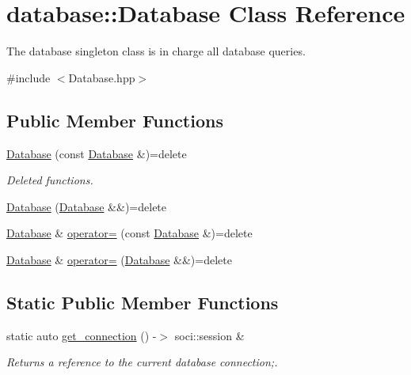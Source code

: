 \hypertarget{classdatabase_1_1_database}{}\section{database\+:\+:Database Class Reference}
\label{classdatabase_1_1_database}


The database singleton class is in charge all database queries.  




{\ttfamily \#include $<$Database.\+hpp$>$}

\subsection*{Public Member Functions}
\begin{DoxyCompactItemize}
\item 
\hyperlink{classdatabase_1_1_database_af32a0bd3a5a492d478a215ef50f6ed14}{Database} (const \hyperlink{classdatabase_1_1_database}{Database} \&)=delete
\begin{DoxyCompactList}\small\item\em Deleted functions. \end{DoxyCompactList}\item 
\hyperlink{classdatabase_1_1_database_af23c97c26b274d8d32eaa9c7af5ee8f4}{Database} (\hyperlink{classdatabase_1_1_database}{Database} \&\&)=delete
\item 
\hyperlink{classdatabase_1_1_database}{Database} \& \hyperlink{classdatabase_1_1_database_afb30d33ce289a82f9f41ac59df63ec68}{operator=} (const \hyperlink{classdatabase_1_1_database}{Database} \&)=delete
\item 
\hyperlink{classdatabase_1_1_database}{Database} \& \hyperlink{classdatabase_1_1_database_a6652af8e150bdc26c786869efde743c0}{operator=} (\hyperlink{classdatabase_1_1_database}{Database} \&\&)=delete
\end{DoxyCompactItemize}
\subsection*{Static Public Member Functions}
\begin{DoxyCompactItemize}
\item 
static auto \hyperlink{classdatabase_1_1_database_a9de5cff42e2434006824d5f98a1e7492}{get\+\_\+connection} () -\/$>$ soci\+::session \&
\begin{DoxyCompactList}\small\item\em Returns a reference to the current database connection;. \end{DoxyCompactList}\end{DoxyCompactItemize}


